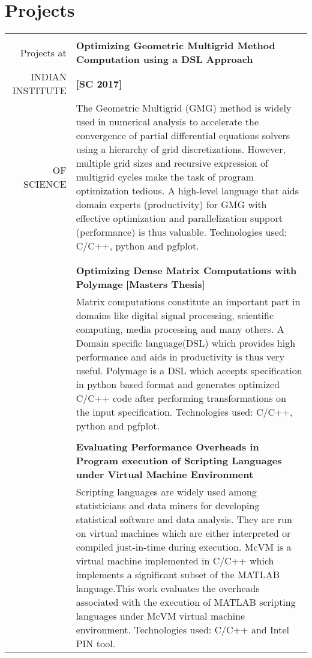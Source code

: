 \documentclass[a4paper,10pt]{article} %
\begin{document}
\section{Projects}
\begin{tabular}{rp{13cm}}
&\\
Projects at & \textbf{Optimizing Geometric Multigrid Method Computation using a DSL Approach} \\
INDIAN INSTITUTE & \hspace{25em} \textbf{[SC 2017]} \\
OF SCIENCE 
& \setlength{\leftskip}{0.4cm}
The Geometric Multigrid (GMG) method is widely used in numerical analysis to accelerate the convergence of partial differential equations solvers using
a hierarchy of grid discretizations. However, multiple grid sizes and recursive 
expression of multigrid cycles make the task of program optimization tedious.
A high-level language that aids domain experts (productivity) for GMG with
effective optimization and parallelization support (performance) is thus
valuable. Technologies used: C/C++, python and pgfplot.\\
& \\
& \\
& \textbf{Optimizing Dense Matrix Computations with Polymage } \hspace{5em} \textbf{[Masters Thesis]}\\
& \setlength{\leftskip}{0.4cm}
Matrix computations constitute an important part in domains like digital signal
processing, scientific computing, media processing and many others. A Domain
specific language(DSL) which provides high performance and aids in productivity is
thus very useful. Polymage is a DSL which accepts specification in python based
format and generates optimized C/C++ code after performing transformations on
the input specification. Technologies used: C/C++, python and pgfplot.\\
&\\
& \textbf{Evaluating Performance Overheads in Program execution of Scripting Languages under Virtual Machine Environment} \\
& \setlength{\leftskip}{0.4cm}
Scripting languages are widely used among statisticians and data miners for
developing statistical software and data analysis. They are run on virtual
machines which are either interpreted or compiled just-in-time during
execution. McVM is a
virtual machine implemented in C/C++ which implements a significant subset of
the MATLAB language.This work evaluates the overheads associated with the execution of
MATLAB scripting languages under McVM virtual machine environment. Technologies used: C/C++ and Intel PIN tool.\\

\end{tabular}
\end{document}
